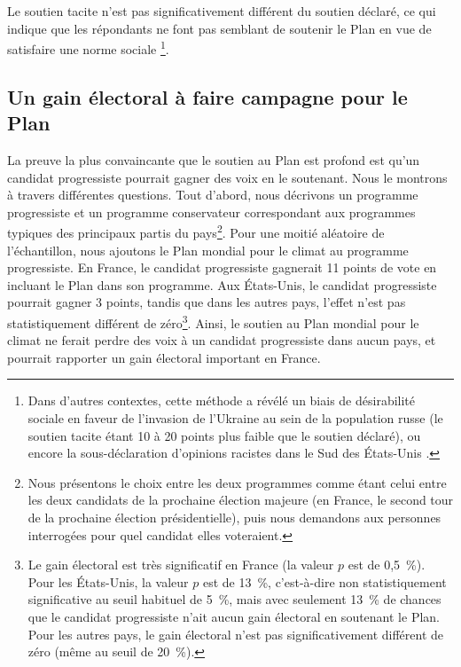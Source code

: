 \documentclass[a5paper,french,openany]{memoir}
\begin{document}
Le soutien tacite n'est pas significativement différent du soutien déclaré, ce qui indique que les répondants ne font pas semblant %
de soutenir le Plan en vue de satisfaire une norme sociale%
\footnote{Dans d'autres contextes, cette méthode a révélé un biais de désirabilité sociale en faveur de l'invasion de l'Ukraine au sein de la population russe (le soutien tacite étant 10 à 20 points plus faible que le soutien déclaré), ou encore la sous-déclaration d'opinions racistes dans le Sud des États-Unis \citep{kuklinski_racial_1997,chapkovski_solid_2022}.}. 

\subsection{Un gain électoral à faire campagne pour le Plan}
La preuve la plus convaincante que le soutien au Plan est profond est qu'un candidat progressiste pourrait gagner des voix en le soutenant. Nous le montrons à travers différentes questions. Tout d'abord, nous décrivons un programme progressiste et un programme conservateur correspondant aux programmes typiques des principaux partis du pays\footnote{Nous présentons le choix entre les deux programmes comme étant celui entre les deux candidats de la prochaine élection majeure (en France, le second tour de la prochaine élection présidentielle), puis nous demandons aux personnes interrogées pour quel candidat elles voteraient.}. Pour une moitié aléatoire de l'échantillon, nous ajoutons le Plan mondial pour le climat au programme progressiste. En France, le candidat progressiste gagnerait 11 points de vote en incluant le Plan dans son programme. Aux États-Unis, le candidat progressiste pourrait gagner 3 points, tandis que dans les autres pays, l'effet n'est pas statistiquement différent de zéro\footnote{Le gain électoral est très significatif en France (la valeur $p$ est de 0,5~\%). Pour les États-Unis, la valeur $p$ est de 13~\%, c'est-à-dire non statistiquement significative au seuil habituel de 5~\%, mais avec seulement 13~\% de chances que le candidat progressiste n'ait aucun gain électoral en soutenant le Plan. Pour les autres pays, le gain électoral n'est pas significativement différent de zéro (même au seuil de 20~\%).}. 
%
Ainsi, le soutien au Plan mondial pour le climat ne ferait perdre des voix à un candidat progressiste dans aucun pays, et pourrait rapporter un gain électoral important en France. 
\end{document}
